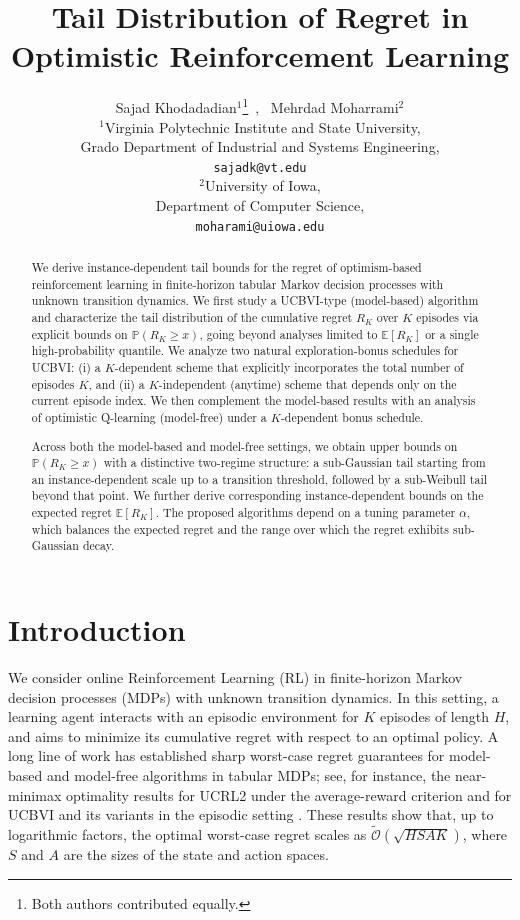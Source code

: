 \documentclass[11pt]{article}
\date{}
\author{
  Sajad Khodadadian$^{1}$\thanks{Both authors contributed equally.}~,~
  Mehrdad Moharrami$^{2}$\footnotemark[1]\\[0.8em]
  $^{1}$Virginia Polytechnic Institute and State University,\\
  Grado Department of Industrial and Systems Engineering,\\
  \texttt{sajadk@vt.edu}\\[0.5em]
  $^{2}$University of Iowa, \\
  Department of Computer Science,\\
  \texttt{moharami@uiowa.edu}
}
\newcommand{\E} {\mathbb{E}}
\newcommand{\PP}{\mathbb{P}}
\begin{document}
\title{Tail Distribution of Regret in Optimistic Reinforcement Learning}

\maketitle

\begin{abstract}
We derive instance-dependent tail bounds for the regret of optimism-based reinforcement learning in finite-horizon tabular Markov decision processes with unknown transition dynamics. We first study a UCBVI-type (model-based) algorithm and characterize the tail distribution of the cumulative regret $R_K$ over $K$ episodes via explicit bounds on $\PP(R_K \ge x)$, going beyond analyses limited to $\E[R_K]$ or a single high-probability quantile. We analyze two natural exploration-bonus schedules for UCBVI: (i) a $K$-dependent scheme that explicitly incorporates the total number of episodes $K$, and (ii) a $K$-independent (anytime) scheme that depends only on the current episode index. We then complement the model-based results with an analysis of optimistic Q-learning (model-free) under a $K$-dependent bonus schedule. 

Across both the model-based and model-free settings, we obtain upper bounds on $\PP(R_K \ge x)$ with a distinctive two-regime structure: a sub-Gaussian tail starting from an instance-dependent scale up to a transition threshold, followed by a sub-Weibull tail beyond that point. We further derive corresponding instance-dependent bounds on the expected regret $\E[R_K]$. The proposed algorithms depend on a tuning parameter $\alpha$, which balances the expected regret and the range over which the regret exhibits sub-Gaussian decay.

\end{abstract}

\section{Introduction}

We consider online Reinforcement Learning (RL) in finite-horizon Markov decision processes (MDPs) with unknown transition dynamics. In this setting, a learning agent interacts with an episodic environment for $K$ episodes of length $H$, and aims to minimize its cumulative regret with respect to an optimal policy. A long line of work has established sharp worst-case regret guarantees for model-based and model-free algorithms in tabular MDPs; see, for instance, the near-minimax optimality results for UCRL2 under the average-reward criterion \citep{jaksch2010near} and for UCBVI and its variants in the episodic setting \citep{azar2017minimax,zanette2019tighter}. These results show that, up to logarithmic factors, the optimal worst-case regret scales as $\widetilde{\mathcal O}(\sqrt{HSAK})$, where $S$ and $A$ are the sizes of the state and action spaces. 
\end{document}
